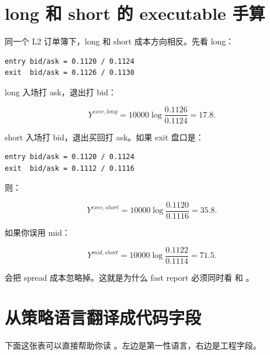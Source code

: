 
\section{long 和 short 的 executable 手算}

同一个 L2 订单簿下，long 和 short 成本方向相反。先看 long：

\begin{lstlisting}
entry bid/ask = 0.1120 / 0.1124
exit  bid/ask = 0.1126 / 0.1130
\end{lstlisting}

long 入场打 ask，退出打 bid：

\[
Y^{exec,long}=10000\log\frac{0.1126}{0.1124}=17.8.
\]

short 入场打 bid，退出买回打 ask。如果 exit 盘口是：

\begin{lstlisting}
entry bid/ask = 0.1120 / 0.1124
exit  bid/ask = 0.1112 / 0.1116
\end{lstlisting}

则：

\[
Y^{exec,short}=10000\log\frac{0.1120}{0.1116}=35.8.
\]

如果你误用 mid：

\[
Y^{mid,short}=10000\log\frac{0.1122}{0.1114}=71.5.
\]

会把 spread 成本忽略掉。这就是为什么 fast report 必须同时看  和 。

\section{从策略语言翻译成代码字段}

下面这张表可以直接帮助你读 。左边是第一性语言，右边是工程字段。

